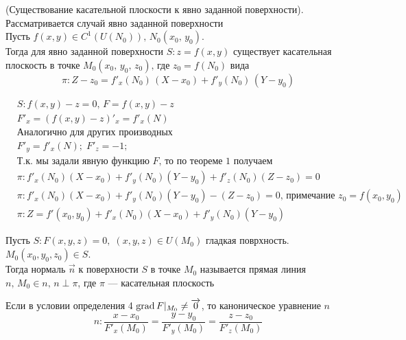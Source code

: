 		\begin{Th}(Существование касательной плоскости к явно заданной поверхности).\\
            Рассматривается случай явно заданной поверхности\\
			Пусть $f(x, y) \in C^1(U(N_0)), \, N_0(x_0,\, y_0)$.\\
			Тогда для явно заданной поверхности $S : z = f(x, y)$ существует касательная плоскость в точке $M_0(x_0,\, y_0,\, z_0), \, \text{где } z_0 = f(N_0)$ вида 
			\[
                \pi: Z-z_0 = f'_x(N_0)\,(X-x_0) + f'_y(N_0)\,(Y-y_0)
            \]
		\end{Th}
		\begin{Proof}
			\begin{align*}
				&S: f(x, y) - z = 0, \, F = f(x, y) - z\\
				&F'_x = (f(x, y) - z)'_x = f'_x(N) \\ 
				&\text{Аналогично для других производных}\\
				&F'_y = f'_x(N); \; F'_z = -1;\\
				&\text{Т.к. мы задали явную функцию $F$, то по теореме 1 получаем}\\
				&\pi : f'_x(N_0)(X-x_0) + f'_y(N_0)(Y-y_0) + f'_z(N_0)(Z-z_0) = 0 \\
				&\pi : f'_x(N_0)(X-x_0) + f'_y(N_0)(Y-y_0) - (Z-z_0) = 0 ,\, \text{примечание } z_0 = f(x_0, y_0)\\
				&\pi : Z = f'(x_0, y_0) + f'_x(N_0)(X-x_0) + f'_y(N_0)(Y-y_0)
			\end{align*}
		\end{Proof}
		
		\begin{Def}
			Пусть $S : F(x,y,z) = 0, \; (x, y, z) \in U(M_0)$ гладкая поврхность. $M_0(x_0, y_0, z_0) \in S$.\\
			Тогда нормаль $\vec{n}$ к поверхности $S$ в точке $M_0$ называется прямая линия $n,\, M_0 \in n,\, n\perp\pi$, где $\pi$ --- касательная плоскость
		\end{Def}
		
		\begin{Note}
			Если в условии определения 4 $ \mathop{\mathrm{grad}} F |_{M_0} \neq \overrightarrow{0}$, то каноническое уравнение $n$
			\[
				n : \frac{x - x_0}{F'_x(M_0)} = \frac{y - y_0}{F'_y(M_0)} = \frac{z - z_0}{F'_z(M_0)}
			\] 
		\end{Note}
		